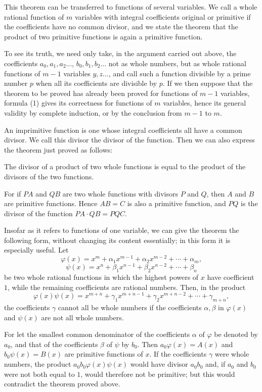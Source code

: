 \documentclass[11pt]{article}
\begin{document}
This theorem can be transferred to functions of several variables. We call a whole rational function of $m$ variables with integral coefficients original or primitive if the coefficients have no common divisor, and we state the theorem that the product of two primitive functions is again a primitive function.

To see its truth, we need only take, in the argument carried out above, the coefficients $a_0,a_1,a_2\ldots$, $b_0,b_1,b_2\ldots$ not as whole numbers, but as whole rational functions of $m-1$ variables $y,z\ldots$, and call such a function divisible by a prime number $p$ when all its coefficients are divisible by $p$. If we then suppose that the theorem to be proved has already been proved for functions of $m-1$ variables, formula (1) gives its correctness for functions of $m$ variables, hence its general validity by complete induction, or by the conclusion from $m-1$ to $m$.

An imprimitive function is one whose integral coefficients all have a common divisor. We call this divisor the divisor of the function. Then we can also express the theorem just proved as follows:

The divisor of a product of two whole functions is equal to the product of the divisors of the two functions.

For if $PA$ and $QB$ are two whole functions with divisors $P$ and $Q$, then $A$ and $B$ are primitive functions. Hence $AB=C$ is also a primitive function, and $PQ$ is the divisor of the function $PA\cdot QB=PQC$.

Insofar as it refers to functions of one variable, we can give the theorem the following form, without changing its content essentially; in this form it is especially useful. Let
\[
 \varphi(x)=x^m+\alpha_1x^{m-1}+\alpha_2x^{m-2}+\cdots+\alpha_m,
\]
\[
 \psi(x)=x^n+\beta_1x^{n-1}+\beta_2x^{n-2}+\cdots+\beta_n
\]
be two whole rational functions in which the highest powers of $x$ have coefficient $1$, while the remaining coefficients are rational numbers. Then, in the product
\[
 \varphi(x)\psi(x)=x^{m+n}+\gamma_1x^{m+n-1}+\gamma_2x^{m+n-2}+\cdots+\gamma_{m+n},
\]
the coefficients $\gamma$ cannot all be whole numbers if the coefficients $\alpha,\beta$ in $\varphi(x)$ and $\psi(x)$ are not all whole numbers.

For let the smallest common denominator of the coefficients $\alpha$ of $\varphi$ be denoted by $a_0$, and that of the coefficients $\beta$ of $\psi$ by $b_0$. Then $a_0\varphi(x)=A(x)$ and $b_0\psi(x)=B(x)$ are primitive functions of $x$. If the coefficients $\gamma$ were whole numbers, the product $a_0b_0\varphi(x)\psi(x)$ would have divisor $a_0b_0$ and, if $a_0$ and $b_0$ were not both equal to $1$, would therefore not be primitive; but this would contradict the theorem proved above.
\end{document}
